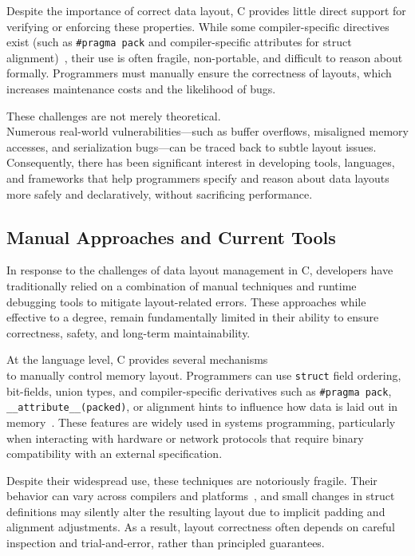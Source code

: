 \documentclass[12pt]{article}
\begin{document}
Despite the importance of correct data layout, C provides little direct support
for verifying or enforcing these properties. While some compiler-specific 
directives exist (such as \texttt{\#pragma pack} and compiler-specific 
attributes for struct alignment)~\autocite{c_compilers}, their use is often fragile, non-portable,
and difficult to reason about formally. Programmers must manually ensure the
correctness of layouts, which increases maintenance costs and the likelihood of
bugs.

These challenges are not merely theoretical.\\ Numerous real-world 
vulnerabilities---such as buffer overflows, misaligned memory accesses, and
serialization bugs---can be traced back to subtle layout issues.
Consequently, there has been significant interest in developing tools,
languages, and frameworks that help programmers specify and reason about
data layouts more safely and declaratively, without sacrificing performance.

\subsection{Manual Approaches and Current Tools}
In response to the challenges of data layout management in C, developers have
traditionally relied on a combination of manual techniques and runtime
debugging tools to mitigate layout-related errors. These approaches
while effective to a degree, remain fundamentally limited in their ability to
ensure correctness, safety, and long-term maintainability.

At the language level, C provides several mechanisms\\ to manually control
memory layout. Programmers can use \texttt{struct} field ordering, bit-fields,
union types, and compiler-specific derivatives such as \texttt{\#pragma pack},
\texttt{\_\_attribute\_\_(packed)}, or alignment hints to influence how data
is laid out in memory~\autocite{C_structures}. These features are widely used in systems programming,
particularly when interacting with hardware or network protocols that require
binary compatibility with an external specification. 

Despite their widespread use, these techniques are notoriously fragile. 
Their behavior can vary across compilers and platforms~\autocite{c_compilers}, and small changes in
struct definitions may silently alter the resulting layout due to implicit
padding and alignment adjustments. As a result, layout correctness often
depends on careful inspection and trial-and-error, rather than principled
guarantees.
\end{document}
